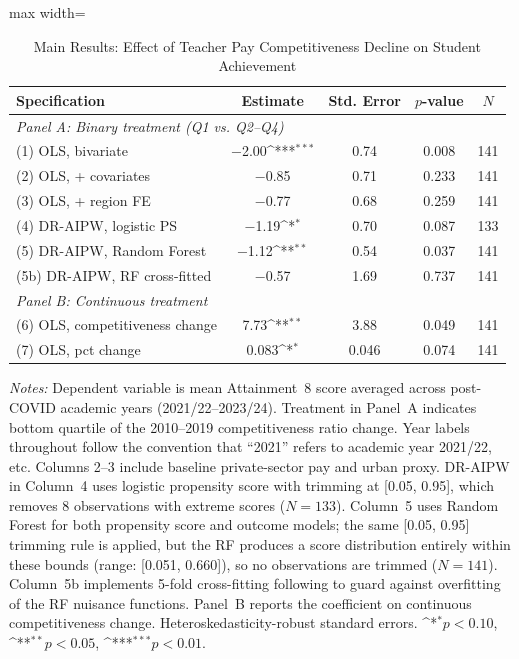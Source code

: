 \documentclass[12pt]{article}
\newcommand{\sym}[1]{\ifmmode^{#1}\else\(^{#1}\)\fi}
\begin{document}
\begin{table}[H]
\centering
\caption{Main Results: Effect of Teacher Pay Competitiveness Decline on Student Achievement}
\label{tab:main}
\begin{adjustbox}{max width=\textwidth}
\begin{threeparttable}
\begin{tabular}{lcccc}
\toprule
Specification & Estimate & Std. Error & $p$-value & $N$ \\
\midrule
\multicolumn{5}{l}{\textit{Panel A: Binary treatment (Q1 vs. Q2--Q4)}} \\
(1) OLS, bivariate & $-$2.00\sym{***} & 0.74 & 0.008 & 141 \\
(2) OLS, + covariates & $-$0.85 & 0.71 & 0.233 & 141 \\
(3) OLS, + region FE & $-$0.77 & 0.68 & 0.259 & 141 \\
(4) DR-AIPW, logistic PS & $-$1.19\sym{*} & 0.70 & 0.087 & 133 \\
(5) DR-AIPW, Random Forest & $-$1.12\sym{**} & 0.54 & 0.037 & 141 \\
(5b) DR-AIPW, RF cross-fitted & $-$0.57 & 1.69 & 0.737 & 141 \\[6pt]
\multicolumn{5}{l}{\textit{Panel B: Continuous treatment}} \\
(6) OLS, competitiveness change & 7.73\sym{**} & 3.88 & 0.049 & 141 \\
(7) OLS, pct change & 0.083\sym{*} & 0.046 & 0.074 & 141 \\
\bottomrule
\end{tabular}
\begin{tablenotes}[flushleft]
\small
\item \textit{Notes:} Dependent variable is mean Attainment~8 score averaged across post-COVID academic years (2021/22--2023/24). Treatment in Panel~A indicates bottom quartile of the 2010--2019 competitiveness ratio change. Year labels throughout follow the convention that ``2021'' refers to academic year 2021/22, etc. Columns 2--3 include baseline private-sector pay and urban proxy. DR-AIPW in Column~4 uses logistic propensity score with trimming at [0.05, 0.95], which removes 8 observations with extreme scores ($N=133$). Column~5 uses Random Forest for both propensity score and outcome models; the same [0.05, 0.95] trimming rule is applied, but the RF produces a score distribution entirely within these bounds (range: [0.051, 0.660]), so no observations are trimmed ($N=141$). Column~5b implements 5-fold cross-fitting following \citet{chernozhukov2018double} to guard against overfitting of the RF nuisance functions. Panel~B reports the coefficient on continuous competitiveness change. Heteroskedasticity-robust standard errors. \sym{*}$p<0.10$, \sym{**}$p<0.05$, \sym{***}$p<0.01$.
\end{tablenotes}
\end{threeparttable}
\end{adjustbox}
\end{table}
\end{document}
